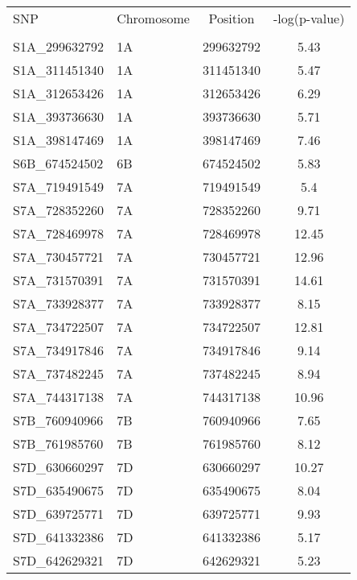 \begin{table}[ht]
\centering
\footnotesize
\begin{tabular}{llcc}
\hline
SNP            & Chromosome & Position  & -log(p-value) \\
               &            &           &               \\
\hline
S1A\_299632792 & 1A         & 299632792 &     5.43      \\
S1A\_311451340 & 1A         & 311451340 &     5.47      \\
S1A\_312653426 & 1A         & 312653426 &     6.29      \\
S1A\_393736630 & 1A         & 393736630 &     5.71      \\
S1A\_398147469 & 1A         & 398147469 &     7.46      \\
S6B\_674524502 & 6B         & 674524502 &     5.83      \\
S7A\_719491549 & 7A         & 719491549 &      5.4      \\
S7A\_728352260 & 7A         & 728352260 &     9.71      \\
S7A\_728469978 & 7A         & 728469978 &     12.45     \\
S7A\_730457721 & 7A         & 730457721 &     12.96     \\
S7A\_731570391 & 7A         & 731570391 &     14.61     \\
S7A\_733928377 & 7A         & 733928377 &     8.15      \\
S7A\_734722507 & 7A         & 734722507 &     12.81     \\
S7A\_734917846 & 7A         & 734917846 &     9.14      \\
S7A\_737482245 & 7A         & 737482245 &     8.94      \\
S7A\_744317138 & 7A         & 744317138 &     10.96     \\
S7B\_760940966 & 7B         & 760940966 &     7.65      \\
S7B\_761985760 & 7B         & 761985760 &     8.12      \\
S7D\_630660297 & 7D         & 630660297 &     10.27     \\
S7D\_635490675 & 7D         & 635490675 &     8.04      \\
S7D\_639725771 & 7D         & 639725771 &     9.93      \\
S7D\_641332386 & 7D         & 641332386 &     5.17      \\
S7D\_642629321 & 7D         & 642629321 &     5.23      \\
\hline
\end{tabular}
\end{table}
